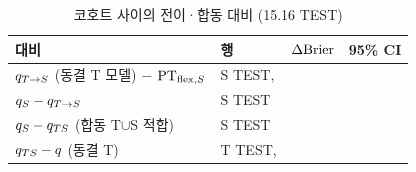 \begin{table}[!t]
  \centering
  \caption{코호트 사이의 전이·합동 대비 (15.16 TEST)}
  \label{tab:transfer-pooling}
  \small
  \begin{tabular}{@{}llrl@{}}
    \toprule
    대비 & 행 & $\Delta\mathrm{Brier}$ & 95\% CI \\
    \midrule
    $q_{T\to S}$ (동결 T 모델) $-$ $\mathrm{PT}_{\mathrm{flex},S}$ & S TEST, \numSTest{} & \dBrierTtoS{} & \ci{\dBrierTtoSLo}{\dBrierTtoSHi} \\
    $q_{S} - q_{T\to S}$ & S TEST & \dBrierSvsTtoS{} & \ci{\dBrierSvsTtoSLo}{\dBrierSvsTtoSHi} \\
    $q_{S} - q_{TS}$ (합동 T$\cup$S 적합) & S TEST & \dBrierSvsTS{} & \ci{\dBrierSvsTSLo}{\dBrierSvsTSHi} \\
    $q_{TS} - q$ (동결 T) & T TEST, \numTTest{} & \dBrierTSvsT{} & \ci{\dBrierTSvsTLo}{\dBrierTSvsTHi} \\
    \bottomrule
  \end{tabular}
\end{table}
